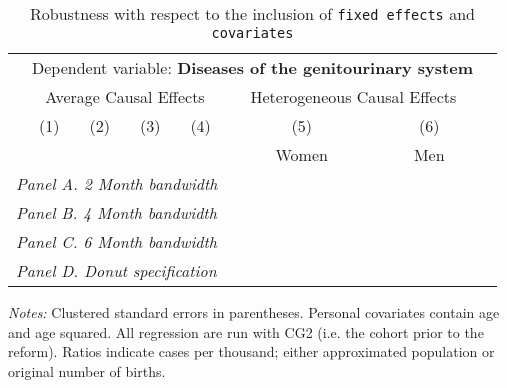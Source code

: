  \begin{table}[H] \begin{threeparttable} \centering \caption{Robustness with respect to the inclusion of \texttt{fixed effects} and \texttt{covariates}} {\def\sym#1{\ifmmode^{#1}\else\(^{#1}\)\fi} \begin{tabular}{l*{7}{c}} \toprule & \multicolumn{6}{c}{Dependent variable: \textbf{Diseases of the genitourinary system}} \\ \cmidrule(lr){2-7}
            &\multicolumn{4}{c}{Average Causal Effects}         &\multicolumn{2}{c}{Heterogeneous Causal Effects}\\\cmidrule(lr){2-5}\cmidrule(lr){6-7}
            &\multicolumn{1}{c}{(1)}&\multicolumn{1}{c}{(2)}&\multicolumn{1}{c}{(3)}&\multicolumn{1}{c}{(4)}&\multicolumn{1}{c}{(5)}&\multicolumn{1}{c}{(6)}\\
            &\multicolumn{1}{c}{}&\multicolumn{1}{c}{}&\multicolumn{1}{c}{}&\multicolumn{1}{c}{}&\multicolumn{1}{c}{Women}&\multicolumn{1}{c}{Men}\\
\midrule
 \multicolumn{7}{l}{\emph{Panel A. 2 Month bandwidth}} \\    \midrule\multicolumn{7}{l}{\emph{Panel B. 4 Month bandwidth}} \\    \midrule\multicolumn{7}{l}{\emph{Panel C. 6 Month bandwidth}} \\    \midrule\multicolumn{7}{l}{\emph{Panel D. Donut specification}} \\    \midrule  
\bottomrule \end{tabular} } \begin{tablenotes} \item \scriptsize \emph{Notes:} Clustered standard errors in parentheses. Personal covariates contain age and age squared. All regression are run with CG2 (i.e. the cohort prior to the reform). Ratios indicate cases per thousand; either approximated population or original number of births. \end{tablenotes} \end{threeparttable} \end{table} 
